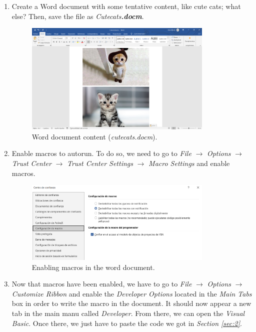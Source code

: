 \begin{enumerate}[label=\textbf{\arabic*}.]
    \item Create a Word document with some tentative content, like cute cats; what else? Then, save the file as \textit{Cutecats\textbf{.docm}}.
    
    \begin{figure}[H]
        \centering
        \includegraphics[width=0.85\textwidth]{Images/Cutecats.png}
        \caption{Word document content (\textit{cutecats.docm}).}
        \label{fig:cutecats}
    \end{figure}
    \vspace{-0.5cm}

    \item Enable macros to autorun. To do so, we need to go to \textit{File} $\rightarrow$ \textit{Options} $\rightarrow$ \textit{Trust Center} $\rightarrow$ \textit{Trust Center Settings} $\rightarrow$ \textit{Macro Settings} and enable macros.
    
    \begin{figure}[H]
        \centering
        \includegraphics[width=0.85\textwidth]{Images/Enable_Macros.png}
        \caption{Enabling macros in the word document.}
        \label{fig:enamble_macros}
    \end{figure}
    \vspace{-0.5cm}

    \item Now that macros have been enabled, we have to go to \textit{File} $\rightarrow$ \textit{Options} $\rightarrow$ \textit{Customize Ribbon} and enable the \textit{Developer Options} located in the \textit{Main Tabs} box in order to write the macro in the document. It should now appear a new tab in the main manu called \textit{Developer}. From there, we can open the \textit{Visual Basic}. Once there, we just have to paste the code we got in \textit{Section \ref{sec:2}}.
\end{enumerate}

